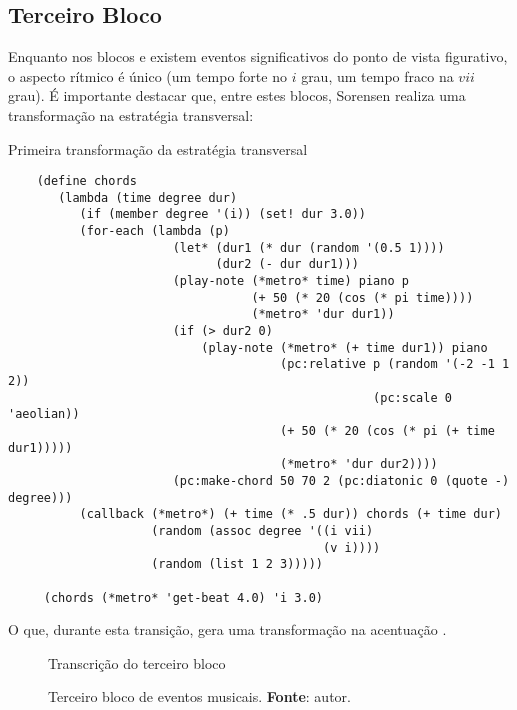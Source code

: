 \subsection{Terceiro Bloco}

Enquanto nos blocos  e  existem eventos significativos do ponto de vista figurativo, o aspecto rítmico é único (um tempo forte no $i$ grau, um tempo fraco na $vii$ grau). É importante destacar que, entre estes blocos, Sorensen realiza uma transformação na estratégia transversal:

\begin{example}{Primeira transformação da estratégia transversal}
\begin{verbatim}
    (define chords
       (lambda (time degree dur)
          (if (member degree '(i)) (set! dur 3.0))
          (for-each (lambda (p)
                       (let* (dur1 (* dur (random '(0.5 1))))
                             (dur2 (- dur dur1)))
                       (play-note (*metro* time) piano p
                                  (+ 50 (* 20 (cos (* pi time))))
                                  (*metro* 'dur dur1))
                       (if (> dur2 0)
                           (play-note (*metro* (+ time dur1)) piano
                                      (pc:relative p (random '(-2 -1 1 2))
                                                   (pc:scale 0 'aeolian))
                                      (+ 50 (* 20 (cos (* pi (+ time dur1)))))
                                      (*metro* 'dur dur2))))
                       (pc:make-chord 50 70 2 (pc:diatonic 0 (quote -) degree)))
          (callback (*metro*) (+ time (* .5 dur)) chords (+ time dur)
                    (random (assoc degree '((i vii)
                                            (v i))))
                    (random (list 1 2 3)))))
    
     (chords (*metro* 'get-beat 4.0) 'i 3.0)
\end{verbatim}
\end{example}

O que, durante esta transição, gera uma transformação na acentuação .

\begin{figure}{Transcrição do terceiro bloco}
  \centering
  
  \caption{Terceiro bloco de eventos musicais. \textbf{Fonte}: autor.}
  \label{fig:ask4}
\end{figure}


